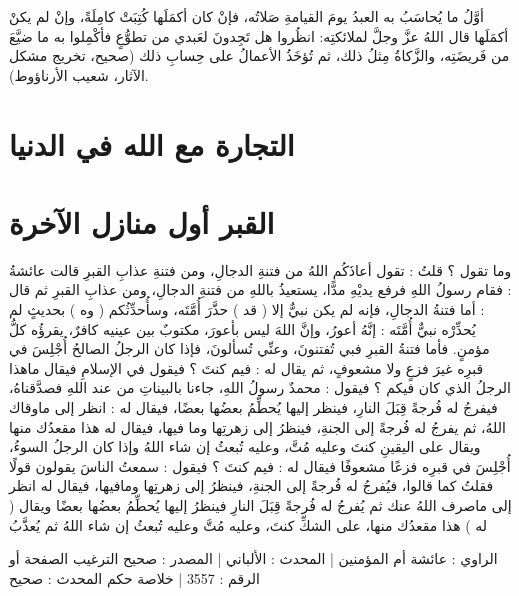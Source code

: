 أوَّلُ ما يُحاسَبُ به العبدُ يومَ القيامةِ صَلاتُه، فإنْ كان أكمَلَها كُتِبَتْ كامِلَةً، وإنْ لم يكنْ أكمَلَها قال اللهُ عزَّ وجلَّ لملائكتِه: انظُروا هل تَجِدونَ لعَبدي من تطوُّعٍ فأكْمِلوا به ما ضيَّعَ من فَريضَتِه، والزَّكاةُ مِثلُ ذلك، ثم تُؤخَذُ الأعمالُ على حِسابِ ذلك {\footnotesize (صحيح، تخريج مشكل الآثار، شعيب الأرناؤوط)}.

\section{التجارة مع الله في الدنيا}

\section{القبر أول منازل الآخرة}

وما تقول ؟ قلتُ : تقول أعاذَكُم اللهُ من فتنةِ الدجالِ، ومن فتنةِ عذابِ القبرِ قالت عائشةُ : فقام رسولُ اللهِ فرفع يديْهِ مدًّا، يستعيذُ باللهِ من فتنةِ الدجالِ، ومن عذابِ القبرِ ثم قال : أما فتنةُ الدجالِ، فإنه لم يكن نبيٌّ إلا ( قد ) حذَّرَ أُمَّتَه، وسأُحدِّثُكم ( وه ) بحديثٍ لم يُحذِّرْه نبيٌّ أُمَّتَه : إنَّهُ أعورُ، وإنَّ اللهَ ليس بأعورَ، مكتوبٌ بين عينيه كافرٌ، يقرؤُه كلُّ مؤمنٍ. فأما فتنةُ القبرِ فبي تُفتنونَ، وعنِّي تُسألونَ، فإذا كان الرجلُ الصالحُ أُجْلِسَ في قبرِه غيرَ فزعٍ ولا مشعوفٍ، ثم يقال له : فيم كنتَ ؟ فيقول في الإسلامِ فيقال ماهذا الرجلُ الذي كان فيكم ؟ فيقول : محمدٌ رسولُ اللهِ، جاءنا بالبيناتِ من عند اللهِ فصدَّقناهُ، فيفرجُ له فُرجةً قِبَلَ النارِ، فينظر إليها يُحطِّمُ بعضُها بعضًا، فيقال له : انظر إلى ماوقاك اللهُ، ثم يفرجُ له فُرجةً إلى الجنةِ، فينظرُ إلى زهرتِها وما فيها، فيقال له هذا مقعدُك منها ويقال على اليقينِ كنتَ وعليه مُتَّ، وعليه تُبعثُ إن شاء اللهُ وإذا كان الرجلُ السوءُ، أُجْلِسَ في قبرِه فزعًا مشعوفًا فيقال له : فيم كنتَ ؟ فيقول : سمعتُ الناسَ يقولون قولًا فقلتُ كما قالوا، فيُفرجُ له فُرجةً إلى الجنةِ، فينظرُ إلى زهرتِها ومافيها، فيقال له انظر إلى ماصرف اللهُ عنك ثم يُفرجُ له فُرجةً قِبَلَ النارِ فينظرُ إليها يُحطِّمُ بعضُها بعضًا ويقال ( له ) هذا مقعدُك منها، على الشكِّ كنتَ، وعليه مُتَّ وعليه تُبعثُ إن شاء اللهُ ثم يُعذَّبُ

الراوي : عائشة أم المؤمنين | المحدث : الألباني | المصدر : صحيح الترغيب
الصفحة أو الرقم : 3557 | خلاصة حكم المحدث : صحيح 


